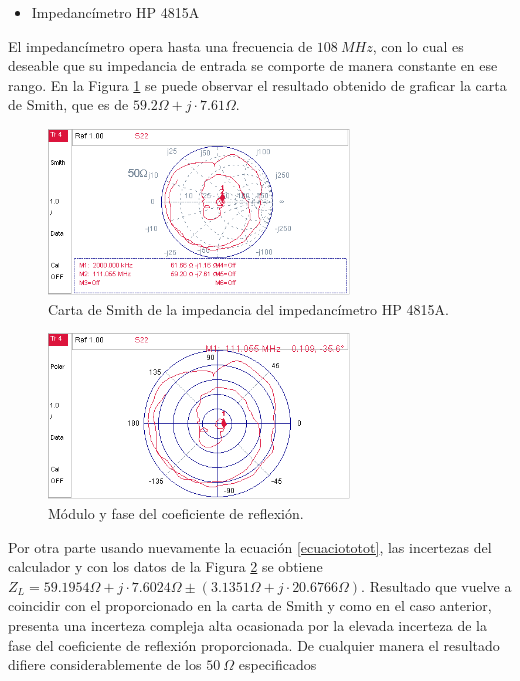 \documentclass[a4paper,10pt]{article}
\begin{document}
		\begin{itemize}
			\item Impedanc\'imetro HP 4815A
		\end{itemize}
		
		\indent El impedanc\'imetro opera hasta una frecuencia de $108~MHz$, con
		lo cual es deseable que su impedancia de entrada se comporte de manera 
		constante en ese rango. En la Figura 
		\ref{tranferenciaimpedanciamiterro} se puede observar el resultado 
		obtenido de graficar la carta de Smith, que es de $59.2\Omega+j\cdot7.61\Omega$.
		
		\begin{figure}[!htb]
			\centering
			\includegraphics[width=8cm]
			{Imagenes/Smithimpedancaiimpedancimetro.png}
			\caption{Carta de Smith de la impedancia del impedanc\'imetro HP 
			4815A.}
			\label{tranferenciaimpedanciamiterro} 
		\end{figure}	
			
		\begin{figure}[!htb]
					\centering
					\includegraphics[width=8cm]
					{Imagenes/CoeficientereflexionIMPE.png}
					\caption{M\'odulo y fase del coeficiente de reflexi\'on.}
					\label{CoeficientereflexionIMPE} 
				\end{figure}
	Por otra parte usando nuevamente la ecuaci\'on \ref{ecuaciototot}, las incertezas del calculador y con los datos de la Figura \ref{CoeficientereflexionIMPE} se obtiene
	$Z_L =59.1954 \Omega + j\cdot 7.6024\Omega \pm (3.1351\Omega +j\cdot20.6766\Omega)$. Resultado que vuelve a coincidir con el proporcionado en la carta de Smith y como en el caso anterior, presenta una incerteza compleja alta ocasionada por la elevada incerteza de la fase del coeficiente de reflexi\'on proporcionada. De cualquier manera el resultado difiere considerablemente de los $50~\Omega$ especificados
	\newpage
\end{document}
